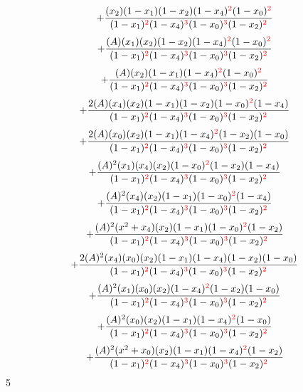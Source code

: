 \documentclass{article}
\begin{document}
\[+\frac{(x_2)(1-x_1)(1-x_2)(1-x_4)^{\textcolor{red}{2}}(1-x_0)^{\textcolor{red}{2}}}{(1-x_1)^{\textcolor{red}{2}}(1-x_4)^{\textcolor{red}{3}}(1-x_0)^{\textcolor{red}{3}}(1-x_2)^{\textcolor{red}{2}}}\]\[+\frac{(A)(x_1)(x_2)(1-x_2)(1-x_4)^{\textcolor{red}{2}}(1-x_0)^{\textcolor{red}{2}}}{(1-x_1)^{\textcolor{red}{2}}(1-x_4)^{\textcolor{red}{3}}(1-x_0)^{\textcolor{red}{3}}(1-x_2)^{\textcolor{red}{2}}}\]\[+\frac{(A)(x_2)(1-x_1)(1-x_4)^{\textcolor{red}{2}}(1-x_0)^{\textcolor{red}{2}}}{(1-x_1)^{\textcolor{red}{2}}(1-x_4)^{\textcolor{red}{3}}(1-x_0)^{\textcolor{red}{3}}(1-x_2)^{\textcolor{red}{2}}}\]\[+\frac{2(A)(x_4)(x_2)(1-x_1)(1-x_2)(1-x_0)^{\textcolor{red}{2}}(1-x_4)}{(1-x_1)^{\textcolor{red}{2}}(1-x_4)^{\textcolor{red}{3}}(1-x_0)^{\textcolor{red}{3}}(1-x_2)^{\textcolor{red}{2}}}\]\[+\frac{2(A)(x_0)(x_2)(1-x_1)(1-x_4)^{\textcolor{red}{2}}(1-x_2)(1-x_0)}{(1-x_1)^{\textcolor{red}{2}}(1-x_4)^{\textcolor{red}{3}}(1-x_0)^{\textcolor{red}{3}}(1-x_2)^{\textcolor{red}{2}}}\]\[+\frac{(A)^{2}(x_1)(x_4)(x_2)(1-x_0)^{\textcolor{red}{2}}(1-x_2)(1-x_4)}{(1-x_1)^{\textcolor{red}{2}}(1-x_4)^{\textcolor{red}{3}}(1-x_0)^{\textcolor{red}{3}}(1-x_2)^{\textcolor{red}{2}}}\]\[+\frac{(A)^{2}(x_4)(x_2)(1-x_1)(1-x_0)^{\textcolor{red}{2}}(1-x_4)}{(1-x_1)^{\textcolor{red}{2}}(1-x_4)^{\textcolor{red}{3}}(1-x_0)^{\textcolor{red}{3}}(1-x_2)^{\textcolor{red}{2}}}\]\[+\frac{(A)^{2}(x^{2}+x_4)(x_2)(1-x_1)(1-x_0)^{\textcolor{red}{2}}(1-x_2)}{(1-x_1)^{\textcolor{red}{2}}(1-x_4)^{\textcolor{red}{3}}(1-x_0)^{\textcolor{red}{3}}(1-x_2)^{\textcolor{red}{2}}}\]\[+\frac{2(A)^{2}(x_4)(x_0)(x_2)(1-x_1)(1-x_4)(1-x_2)(1-x_0)}{(1-x_1)^{\textcolor{red}{2}}(1-x_4)^{\textcolor{red}{3}}(1-x_0)^{\textcolor{red}{3}}(1-x_2)^{\textcolor{red}{2}}}\]\[+\frac{(A)^{2}(x_1)(x_0)(x_2)(1-x_4)^{\textcolor{red}{2}}(1-x_2)(1-x_0)}{(1-x_1)^{\textcolor{red}{2}}(1-x_4)^{\textcolor{red}{3}}(1-x_0)^{\textcolor{red}{3}}(1-x_2)^{\textcolor{red}{2}}}\]\[+\frac{(A)^{2}(x_0)(x_2)(1-x_1)(1-x_4)^{\textcolor{red}{2}}(1-x_0)}{(1-x_1)^{\textcolor{red}{2}}(1-x_4)^{\textcolor{red}{3}}(1-x_0)^{\textcolor{red}{3}}(1-x_2)^{\textcolor{red}{2}}}\]\[+\frac{(A)^{2}(x^{2}+x_0)(x_2)(1-x_1)(1-x_4)^{\textcolor{red}{2}}(1-x_2)}{(1-x_1)^{\textcolor{red}{2}}(1-x_4)^{\textcolor{red}{3}}(1-x_0)^{\textcolor{red}{3}}(1-x_2)^{\textcolor{red}{2}}}\]
5
\end{document}
